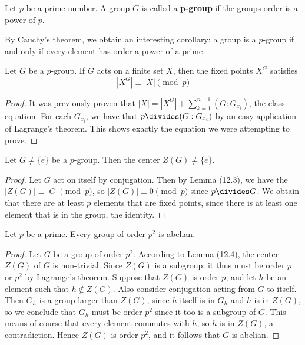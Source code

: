 \begin{definition}
    Let $p$ be a prime number. A group $G$ is called a {\bf p-group}  if the groups order is a power of $p$.
\end{definition}

By Cauchy's theorem, we obtain an interesting corollary: a group is a $p$-group if and only if every element has order a power of a prime.

\begin{lemma}
    Let $G$ be a $p$-group. If $G$ acts on a finite set $X$, then the fixed points $X^G$ satisfies
    \[ |X^G| \equiv |X| \pmod{p} \]
\end{lemma}
\begin{proof}
    It was previously proven that $|X| = |X^G| + \sum_{k=1}^{n-1} (G:G_{x_i})$, the class equation. For each $G_{x_i}$, we have that $p \divides (G:G_{x_i})$ by an easy application of Lagrange's theorem. This shows exactly the equation we were attempting to prove.
\end{proof}

\begin{lemma}
    Let $G \neq \{e\}$ be a $p$-group. Then the center $Z(G) \neq \{e\}$.
\end{lemma}
\begin{proof}
    Let $G$ act on itself by conjugation. Then by Lemma (12.3), we have the $|Z(G)| \equiv |G| \pmod{p}$, so $|Z(G)| \equiv 0 \pmod{p}$ since $p \divides G$. We obtain that there are at least $p$ elements that are fixed points, since there is at least one element that is in the group, the identity.
\end{proof}

\begin{corollary}
    Let $p$ be a prime. Every group of order $p^2$ is abelian.
\end{corollary}
\begin{proof}
    Let $G$ be a group of order $p^2$. According to Lemma (12.4), the center $Z(G)$ of $G$ is non-trivial. Since $Z(G)$ is a subgroup, it thus must be order $p$ or $p^2$ by Lagrange's theorem. Suppose that $Z(G)$ is order $p$, and let $h$ be an element such that $h \notin Z(G)$. Also consider conjugation acting from $G$ to itself. Then $G_h$ is a group larger than $Z(G)$, since $h$ itself is in $G_h$ and $h$ is in $Z(G)$, so we conclude that $G_h$ must be order $p^2$ since it too is a subgroup of $G$. This means of course that every element commutes with $h$, so $h$ is in $Z(G)$, a contradiction. Hence $Z(G)$ is order $p^2$, and it follows that $G$ is abelian.
\end{proof}


